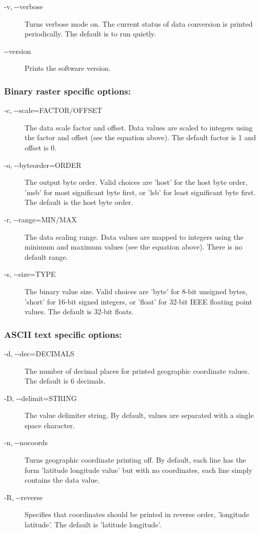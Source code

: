 \begin{description}
\begin{itemize}
\end{itemize}

\item[ -v, -{-}verbose ] Turns verbose mode on. The current status of data conversion is printed periodically. The default is to run quietly. 
\item[-{-}version]Prints the software version.

\end{description}
\subsubsection*{Binary raster specific options:}
\begin{description}
\item[ -c, -{-}scale=FACTOR/OFFSET ] The data scale factor and offset. Data values are scaled to integers using the factor and offset (see the equation above). The default factor is 1 and offset is 0. 
\item[ -o, -{-}byteorder=ORDER ] The output byte order. Valid choices are 'host' for the host byte order, 'msb' for most significant byte first, or 'lsb' for least significant byte first. The default is the host byte order. 
\item[ -r, -{-}range=MIN/MAX ] The data scaling range. Data values are mapped to integers using the minimum and maximum values (see the equation above). There is no default range. 
\item[ -s, -{-}size=TYPE ] The binary value size. Valid choices are 'byte' for 8-bit unsigned bytes, 'short' for 16-bit signed integers, or 'float' for 32-bit IEEE floating point values. The default is 32-bit floats. 

\end{description}
\subsubsection*{ASCII text specific options:}
\begin{description}
\item[ -d, -{-}dec=DECIMALS ] The number of decimal places for printed geographic coordinate values. The default is 6 decimals. 
\item[ -D, -{-}delimit=STRING ] The value delimiter string. By default, values are separated with a single space character. 
\item[ -n, -{-}nocoords ] Turns geographic coordinate printing off. By default, each line has the form 'latitude longitude value' but with no coordinates, each line simply contains the data value. 
\item[ -R, -{-}reverse ] Specifies that coordinates should be printed in reverse order, 'longitude latitude'. The default is 'latitude longitude'. 

\end{description}

